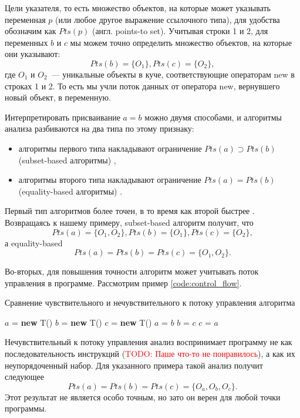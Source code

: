 \documentclass[14pt,titlepage]{extarticle}
\newcommand{\NEW}{\textbf{new }}
\newcommand{\todo}[1]{\textcolor{red}{\eng{TODO}: #1}}
\newcommand{\eng}[1]{{\English#1}}
\begin{document}
      Цели указателя, то есть множество объектов, на которые может указывать
      переменная $p$ (или любое другое выражение ссылочного типа), для удобства
      обозначим как $Pts(p)$ (англ. \eng{points-to set}).
      Учитывая строки 1 и 2, для переменных $b$ и $c$ мы можем точно определить
      множество объектов, на которые они указывают:
      \[Pts(b) = \{O_1\}, Pts(c) = \{O_2\},\] где $O_1$ и $O_2$~--- уникальные
      объекты в куче, соответствующие операторам new в строках 1 и 2.
      То есть мы учли поток данных от оператора new, вернувшего новый объект, в
      переменную.

      Интерпретировать присваивание $a = b$ можно двумя способами,
      и алгоритмы анализа разбиваются на два типа по этому признаку:
      \begin{itemize}
        \item алгоритмы первого типа накладывают ограничение
              $Pts(a) \supset Pts(b)$ (\eng{subset-based} алгоритмы)
              \cite{rayside_overview},
        \item алгоритмы второго типа накладывают ограничение
              $Pts(a) = Pts(b)$ (\eng{equality-based} алгоритмы)
              \cite{rayside_overview}.
      \end{itemize}
      Первый тип алгоритмов более точен, в то время как второй быстрее
      \cite{steensgaard}. Возвращаясь к нашему примеру, \eng{subset-based}
      алгоритм получит, что
      \[Pts(a) = \{O_1, O_2\}, Pts(b) = \{O_1\}, Pts(c) = \{O_2\},\]
      а \eng{equality-based}
      \[Pts(a) = Pts(b) = Pts(c) = \{O_1, O_2\}.\]

      Во-вторых, для повышения точности алгоритм может учитывать поток управления
      в программе.
      Рассмотрим пример \ref{code:control_flow}.
      \begin{algorithm}
        \caption{Сравнение чувствительного и нечувствительного к потоку
                 управления алгоритма}
        \label{code:control_flow}
        \begin{algorithmic}[1]
          \STATE $a$ = \NEW T()
          \STATE $b$ = \NEW T()
          \STATE $c$ = \NEW T()
          \STATE $a$ = $b$
          \STATE $b$ = $c$
          \STATE $c$ = $a$
        \end{algorithmic}
      \end{algorithm}

      Нечувствительный к потоку управления анализ воспринимает программу не как
      последовательность инструкций (\todo{Паше что-то не понравилось}),
      а как их неупорядоченный набор.
      Для указанного примера такой анализ получит следующее
      \[Pts(a) = Pts(b) = Pts(c) = \{O_a, O_b, O_c\}.\]
      Этот результат не является особо точным, но зато он верен
      для любой точки программы.
\end{document}

